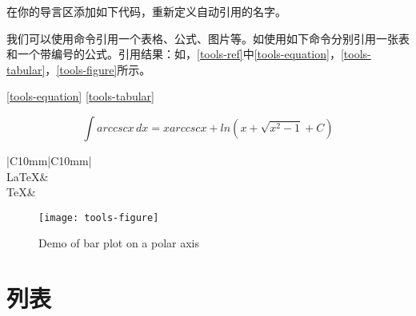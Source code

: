 在你的导言区添加如下代码，重新定义自动引用的名字。
\begin{latex}{}
\end{latex}

我们可以使用命令引用一个表格、公式、图片等。如使用如下命令分别引用一张表和一个带编号的公式。引用结果：如\pageref{tools-ref}，\autoref{tools-ref}中\autoref{tools-equation}，\autoref{tools-tabular}，\autoref{tools-figure}所示。




\begin{latex}{}
\ref{tools-equation}
\ref{tools-tabular}
\end{latex}

\begin{equation}\label{tools-equation}
\int arccscx\,dx=xarccscx+ln(x+\sqrt{x^2-1}+C)
\end{equation}

\begin{table}[!ht]
\begin{center}
	\caption{\TeX 家族标识符}
	\label{tools-tabular}
	\begin{tabular}{|C{10mm}|C{10mm}|}
		\hline
		\\
		\hline
		\LaTeX & \LaTeXe\\
		\hline
		\TeX & \XeLaTeX\\
		\hline
	\end{tabular}
\end{center}
\end{table}

\begin{figure}[!ht]
	\begin{center}
		\texttt{[image: tools-figure]}
		\caption{Demo of bar plot on a polar axis}
		\label{tools-figure}
	\end{center}
\end{figure}



\section{列表}
